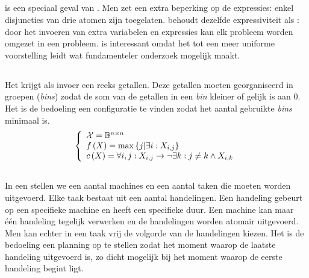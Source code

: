 \subsection{}
 is een speciaal geval van . Men zet een extra beperking op de expressies: enkel disjuncties van drie atomen zijn toegelaten.  behoudt dezelfde expressiviteit als : door het invoeren van extra variabelen en expressies kan elk  probleem worden omgezet in een  probleem.  is interessant omdat het tot een meer uniforme voorstelling leidt wat fundamenteler onderzoek mogelijk maakt.

\subsection{}

Het  krijgt als invoer een reeks getallen. Deze getallen moeten georganiseerd in groepen (\emph{bins}) zodat de som van de getallen in een \emph{bin} kleiner of gelijk is aan 0. Het is de bedoeling een configuratie te vinden zodat het aantal gebruikte \emph{bins} minimaal is.
\begin{equation}
\left\{\begin{array}{ll}
\mathcal{X}=\mathbb{B}^{n\times n}\\
f\left(X\right)=\displaystyle\max\left\{ j|\exists i:X_{i,j}\right\}\\
c\left(X\right)=\forall i,j:X_{i,j}\rightarrow \neg\exists k:j\neq k\wedge X_{i,k}\end{array}\right.
\end{equation}

\subsection{}

In een  stellen we een aantal machines en een aantal taken die moeten worden uitgevoerd. Elke taak bestaat uit een aantal handelingen. Een handeling gebeurt op een specifieke machine en heeft een specifieke duur. Een machine kan maar \'e\'en handeling tegelijk verwerken en de handelingen worden atomair uitgevoerd. Men kan echter in een taak vrij de volgorde van de handelingen kiezen. Het is de bedoeling een planning op te stellen zodat het moment waarop de laatste handeling uitgevoerd is, zo dicht mogelijk bij het moment waarop de eerste handeling begint ligt.

